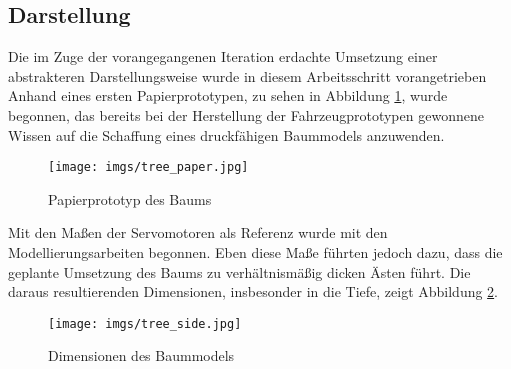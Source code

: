 \documentclass[.../Dokumentation.tex]{subfiles}
\begin{document}
\subsection{Darstellung}\label{sec-ita2-visualization}
Die im Zuge der vorangegangenen Iteration erdachte Umsetzung einer abstrakteren 
Darstellungsweise wurde in diesem Arbeitsschritt vorangetrieben\\
Anhand eines ersten Papierprototypen, zu sehen in Abbildung 
\ref{fig-tree-paper}, wurde begonnen, das bereits bei der Herstellung der 
Fahrzeugprototypen gewonnene Wissen auf die Schaffung eines druckfähigen 
Baummodels anzuwenden.
\begin{figure}[H]
\begin{center}
    \texttt{[image: imgs/tree\_paper.jpg]}
    \caption{Papierprototyp des Baums}
    \label{fig-tree-paper}
\end{center}
\end{figure}
\noindent
Mit den Maßen der Servomotoren als Referenz wurde mit den Modellierungsarbeiten 
begonnen. Eben diese Maße führten jedoch dazu, dass die geplante Umsetzung 
des Baums zu verhältnismäßig dicken Ästen führt. 
Die daraus resultierenden Dimensionen, insbesonder in die Tiefe, zeigt 
Abbildung \ref{fig-tree-side}.
\begin{figure}[H]
\begin{center}
    \texttt{[image: imgs/tree\_side.jpg]}
    \caption{Dimensionen des Baummodels}
    \label{fig-tree-side}
\end{center}
\end{figure}
\end{document}
